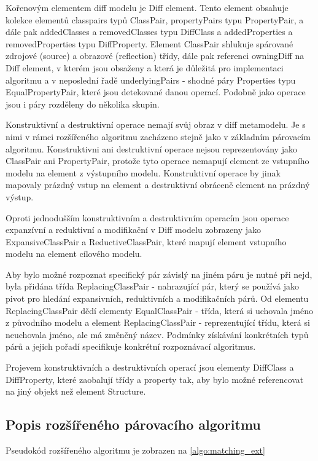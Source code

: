 \documentclass[11pt,twoside,a4paper]{book}
\begin{document}
  Kořenovým elementem diff modelu je Diff element.
 Tento element obsahuje kolekce elementů classpairs typů ClassPair, propertyPairs
 typu PropertyPair, a dále pak addedClasses a removedClasses typu DiffClass a
 addedProperties a removedProperties typu DiffProperty. Element ClassPair
 shlukuje spárované zdrojové (source) a obrazové (reflection) třídy, dále pak
 referenci owningDiff na Diff element, v kterém jsou obsaženy a která je
 důležitá pro implementaci algoritmu a v neposlední řadě underlyingPairs -
 shodné páry Properties typu EqualPropertyPair, které jsou detekované danou
 operací. Podobně jako operace jsou i páry rozděleny do několika skupin.
 
 Konstruktivní a destruktivní operace nemají svůj obraz v diff metamodelu. Je s
 nimi v rámci rozšířeného algoritmu zacházeno stejně jako v základním párovacím
 algoritmu.
 Konstruktivni ani destruktivní operace nejsou reprezentovány jako ClassPair ani
 PropertyPair, protože tyto operace nemapují element ze vstupního modelu na
 element z výstupního modelu.
 Konstruktivní operace by jinak mapovaly prázdný vstup na element a
 destruktivní obráceně element na prázdný výstup.
 
 Oproti jednodušším konstruktivním a destruktivním operacím jsou operace
 expanzívní a reduktivní a modifikační v Diff modelu zobrazeny jako
 ExpansiveClassPair a ReductiveClassPair, které mapují element
 vstupního modelu na element cílového modelu. 
 
 Aby bylo možné rozpoznat specifický pár závislý na jiném páru je nutné při
 nejd, byla přidána třída ReplacingClassPair - nahrazující pár, který se
 používá jako pivot pro hledání expansivních, reduktivních a modifikačních
 párů. Od elementu ReplacingClassPair dědí elementy EqualClassPair - třída,
 která si uchovala jméno z původního modelu a element ReplacingClassPair -
 reprezentující třídu, která si neuchovala jméno, ale má změněný název.
 Podmínky získávání konkrétních typů párů a jejich pořadí specifikuje konkrétní
 rozpoznávací algoritmus.
 
 Projevem konstruktivních a destruktivních operací jsou elementy DiffClass a
 DiffProperty, které zaobalují třídy a property tak, aby bylo možné referencovat
 na jiný objekt než element Structure. 

\subsection{Popis rozšířeného párovacího algoritmu}
Pseudokód rozšířeného algoritmu je zobrazen na \ref{algo:matching_ext}
\end{document}
